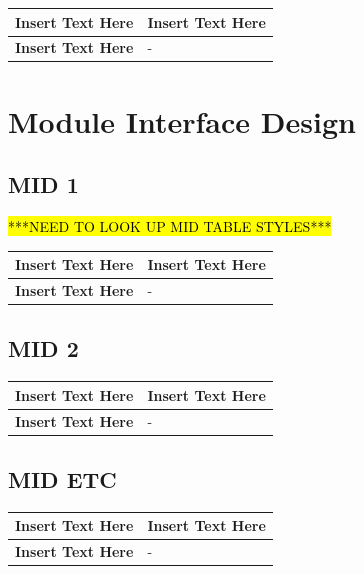 \documentclass [11pt]{article}
\begin{document}
\begin{longtable}{| p{ } | p{ } | }\hline 
\textbf{Insert Text Here} & \textbf{Insert Text Here} \\ \hline
\textbf{Insert Text Here} & -\\ \hline 
\end{longtable}




\section{Module Interface Design}
\subsection {MID 1}

\hl{***NEED TO LOOK UP MID TABLE STYLES***}

\begin{longtable}{| p{ } | p{ } | }\hline 
\textbf{Insert Text Here} & \textbf{Insert Text Here} \\ \hline
\textbf{Insert Text Here} & -\\ \hline 
\end{longtable}


\subsection {MID 2 }

\begin{longtable}{| p{ } | p{ } | }\hline 
\textbf{Insert Text Here} & \textbf{Insert Text Here} \\ \hline
\textbf{Insert Text Here} & -\\ \hline 
\end{longtable}


\subsection {MID ETC}

\begin{longtable}{| p{ } | p{ } | }\hline 
\textbf{Insert Text Here} & \textbf{Insert Text Here} \\ \hline
\textbf{Insert Text Here} & -\\ \hline 
\end{longtable}
\end{document}
